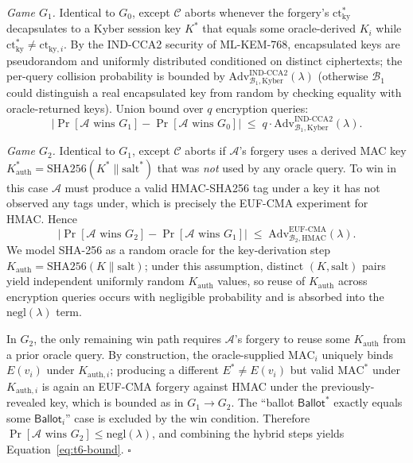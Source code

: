 \emph{Game $G_1$.} Identical to $G_0$, except $\mathcal{C}$ aborts whenever the forgery's $\text{ct}_{\text{ky}}^*$ decapsulates to a Kyber session key $K^*$ that equals some oracle-derived $K_i$ while $\text{ct}_{\text{ky}}^* \neq \text{ct}_{\text{ky},i}$. By the IND-CCA2 security of ML-KEM-768, encapsulated keys are pseudorandom and uniformly distributed conditioned on distinct ciphertexts; the per-query collision probability is bounded by $\mathrm{Adv}^{\mathrm{IND\text{-}CCA2}}_{\mathcal{B}_1, \mathrm{Kyber}}(\lambda)$ (otherwise $\mathcal{B}_1$ could distinguish a real encapsulated key from random by checking equality with oracle-returned keys). Union bound over $q$ encryption queries:
\begin{equation*}
    |\Pr[\mathcal{A} \text{ wins } G_1] - \Pr[\mathcal{A} \text{ wins } G_0]| \;\leq\; q \cdot \mathrm{Adv}^{\mathrm{IND\text{-}CCA2}}_{\mathcal{B}_1, \mathrm{Kyber}}(\lambda).
\end{equation*}

\emph{Game $G_2$.} Identical to $G_1$, except $\mathcal{C}$ aborts if $\mathcal{A}$'s forgery uses a derived MAC key $K_{\text{auth}}^* = \text{SHA256}(K^* \| \text{salt}^*)$ that was \emph{not} used by any oracle query. To win in this case $\mathcal{A}$ must produce a valid HMAC-SHA256 tag under a key it has not observed any tags under, which is precisely the EUF-CMA experiment for HMAC. Hence
\begin{equation*}
    |\Pr[\mathcal{A} \text{ wins } G_2] - \Pr[\mathcal{A} \text{ wins } G_1]| \;\leq\; \mathrm{Adv}^{\mathrm{EUF\text{-}CMA}}_{\mathcal{B}_2, \mathrm{HMAC}}(\lambda).
\end{equation*}
We model SHA-256 as a random oracle for the key-derivation step $K_{\text{auth}} = \text{SHA256}(K \| \text{salt})$; under this assumption, distinct $(K, \text{salt})$ pairs yield independent uniformly random $K_{\text{auth}}$ values, so reuse of $K_{\text{auth}}$ across encryption queries occurs with negligible probability and is absorbed into the $\mathrm{negl}(\lambda)$ term.

In $G_2$, the only remaining win path requires $\mathcal{A}$'s forgery to reuse some $K_{\text{auth}}$ from a prior oracle query. By construction, the oracle-supplied $\text{MAC}_i$ uniquely binds $E(v_i)$ under $K_{\text{auth},i}$; producing a different $E^* \neq E(v_i)$ but valid $\text{MAC}^*$ under $K_{\text{auth},i}$ is again an EUF-CMA forgery against HMAC under the previously-revealed key, which is bounded as in $G_1 \to G_2$. The ``ballot $\mathsf{Ballot}^*$ exactly equals some $\mathsf{Ballot}_i$'' case is excluded by the win condition. Therefore $\Pr[\mathcal{A} \text{ wins } G_2] \leq \mathrm{negl}(\lambda)$, and combining the hybrid steps yields Equation~\eqref{eq:t6-bound}. \hfill $\square$

